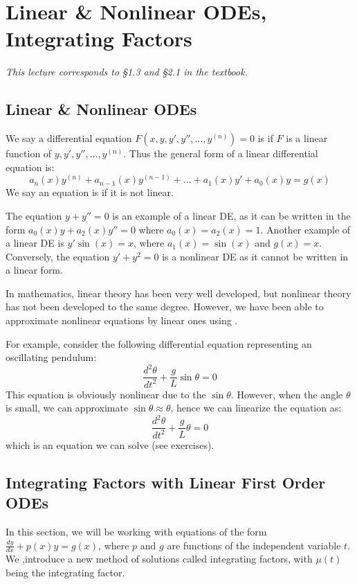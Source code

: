 \section{Linear \& Nonlinear ODEs, Integrating Factors}

\it{This lecture corresponds to \S1.3 and \S2.1 in the textbook.}

\subsection{Linear \& Nonlinear ODEs}

\begin{defbox}
    We say a differential equation $F(x, y, y', y'', \dots, y^{(n)}) = 0$ is  if $F$ is a linear function of $y, y', y'', \dots, y^{(n)}$. Thus the general form of a linear differential equation is:
    \[a_n(x)y^{(n)} + a_{n-1}(x)y^{(n-1)} + \dots + a_1(x)y' + a_0(x)y = g(x)\]
    We say an equation is  if it is not linear.
\end{defbox}

The equation $y + y'' = 0$ is an example of a linear DE, as it can be written in the form $a_0(x)y + a_2(x)y'' = 0$ where $a_0(x) = a_2(x) = 1$. Another example of a linear DE is $y'\sin(x) = x$, where $a_1(x) = \sin(x)$ and $g(x) = x$. Conversely, the equation $y' + y^2 = 0$ is a nonlinear DE as it cannot be written in a linear form.

In mathematics, linear theory has been very well developed, but nonlinear theory has not been developed to the same degree. However, we have been able to approximate nonlinear equations by linear ones using .

For example, consider the following differential equation representing an oscillating pendulum:
\[\frac{d^2\theta}{dt^2} + \frac{g}{L}\sin\theta = 0\]
This equation is obviously nonlinear due to the $\sin\theta$. However, when the angle $\theta$ is small, we can approximate $\sin\theta \approx \theta$, hence we can linearize the equation as:
\[\frac{d^2\theta}{dt^2} + \frac{g}{L}\theta = 0\]
which is an equation we can solve (see exercises).

\subsection{Integrating Factors with Linear First Order ODEs}

In this section, we will be working with equations of the form $\frac{dy}{dx} + p(x)y = g(x)$, where $p$ and $g$ are functions of the independent variable $t$. We ,introduce a new method of solutions called integrating factors, with $\mu(t)$ being the integrating factor.

